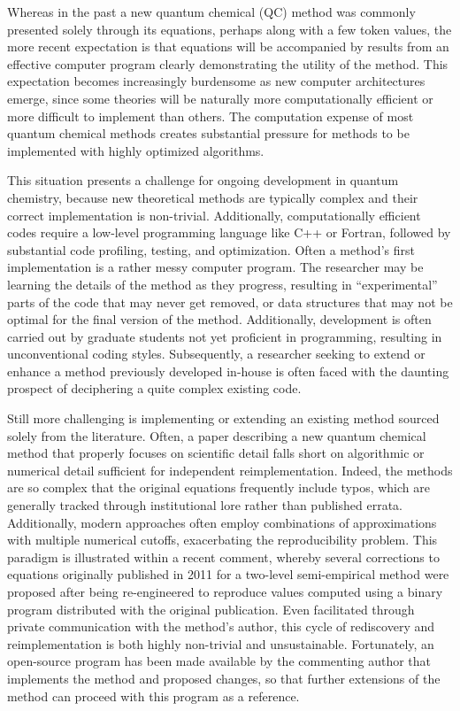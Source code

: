\documentclass[%
  class = book,%
  crop = false,%
  float = true,%
  multi = true,%
  preview = false,%
]{standalone}
\let\cite\autocite
\begin{document}
Whereas in the past a new quantum chemical (QC) method was commonly presented solely through its equations, perhaps along with a few token values, the more recent expectation is that equations will be accompanied by results from an effective computer program clearly demonstrating the utility of the method.  This expectation becomes increasingly burdensome as new computer architectures emerge, since some theories will be naturally more computationally efficient or more difficult to implement than others.  The computation expense of most quantum chemical methods creates substantial pressure for methods to be implemented with highly optimized algorithms.

This situation presents a challenge for ongoing development in quantum chemistry, because new theoretical methods are typically complex and their correct implementation is non-trivial.  Additionally, computationally efficient codes require a low-level programming language like C++ or Fortran, followed by substantial code profiling, testing, and optimization.  Often a method's first implementation is a rather messy computer program. The researcher may be learning the details of the method as they progress, resulting in ``experimental'' parts of the code that may never get removed, or data structures that may not be optimal for the final version of the method.  Additionally, development is often carried out by graduate students not yet proficient in programming, resulting in unconventional coding styles.  Subsequently, a researcher seeking to extend or enhance a method previously developed in-house is often faced with the daunting prospect of deciphering a quite complex existing code.

Still more challenging is implementing or extending an existing method sourced solely from the literature.  Often, a paper describing a new quantum chemical method that properly focuses on scientific detail falls short on algorithmic or numerical detail sufficient for independent reimplementation. Indeed, the methods are so complex that the original equations frequently include typos, which are generally tracked through institutional lore rather than published errata.  Additionally, modern approaches often employ combinations of approximations with multiple numerical cutoffs, exacerbating the reproducibility problem.  This paradigm is illustrated within a recent comment,\cite{Briling:2017:157101} whereby several corrections to equations originally published in 2011 for a two-level semi-empirical method\cite{Laikov:2011:134120} were proposed after being re-engineered to reproduce values computed using a binary program distributed with the original publication.  Even facilitated through private communication with the method's author, this cycle of rediscovery and reimplementation is both highly non-trivial and unsustainable.  Fortunately, an open-source program\cite{brilingqm} has been made available by the commenting author that implements the method and proposed changes, so that further extensions of the method can proceed with this program as a reference.
\end{document}
